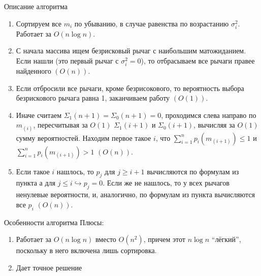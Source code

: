 \documentclass[11pt]{beamer} %
\begin{document}
    \begin{frame}{Описание алгоритма}
        \begin{enumerate}
            \item<1-> Сортируем все $m_i$ по убыванию, в случае равенства по возрастанию $\sigma_i^2$. Работает за $O(n \log n)$.
            \item<2-> С начала массива ищем безрисковый рычаг с наибольшим матожиданием. Если нашли (это первый рычаг с $\sigma_i^2 = 0$), то отбрасываем все рычаги правее найденного $\left(O(n) \right)$. 
            \item<3-> Если отбросили все рычаги, кроме безрисокового, то вероятность выбора безрискового рычага равна 1, заканчиваем работу $\left( O(1) \right)$.
            \item<4-> Иначе считаем $\Sigma_1(n+1) = \Sigma_0(n+1) = 0$, проходимся слева направо по $m_{(i)}$, пересчитывая за $O(1)$ $\Sigma_1(i+1)$ и $\Sigma_0(i+1)$, вычисляя за $O(1)$ сумму вероятностей. Находим первое такое $i$, что $\sum_{i=1}^n p_i(m_{(i+1)}) \leq 1$ и $\sum_{i=1}^n p_i(m_{(i+1)}) > 1$ $\left( O(n) \right)$.
            \item<5-> Если такое $i$ нашлось, то $p_j$ для $j \geq i + 1$ вычисляются по формулам из пункта  а для $j \leq i \hookrightarrow p_j = 0$. Если же не нашлось, то у всех рычагов ненулевые вероятности, и, аналогично, по формулам из пункта  вычисляются все $p_i$ $\left( O(n) \right)$.
        \end{enumerate}
    \end{frame}
    \begin{frame}{Особенности алгоритма}
        Плюсы:
        \begin{enumerate}
            \item<1-> Работает за $O(n \log n)$ вместо $O(n^2)$, причем этот $n \log n$ ``лёгкий'', поскольку в него включена лишь сортировка.
            \item<2-> Дает точное решение
        \end{enumerate}
    \end{frame}
\end{document}
